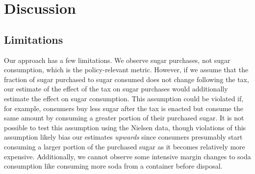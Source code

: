 \documentclass[12pt]{article}
\begin{document}


\section{Discussion} \label{discussion}






\subsection{Limitations}

Our approach has a few limitations. We observe sugar purchases, not sugar consumption, which is the policy-relevant metric. However, if we assume that the fraction of sugar purchased to sugar consumed does not change following the tax, our estimate of the effect of the tax on sugar purchases would additionally estimate the effect on sugar consumption. This assumption could be violated if, for example, consumers buy less sugar after the tax is enacted but consume the same amount by consuming a greater portion of their purchased sugar. It is not possible to test this assumption using the Nielsen data, though violations of this assumption likely bias our estimates \textit{upwards} since consumers presumably start consuming a larger portion of the purchased sugar as it becomes relatively more expensive. Additionally, we cannot observe some intensive margin changes to soda consumption like consuming more soda from a container before disposal.
\end{document}
